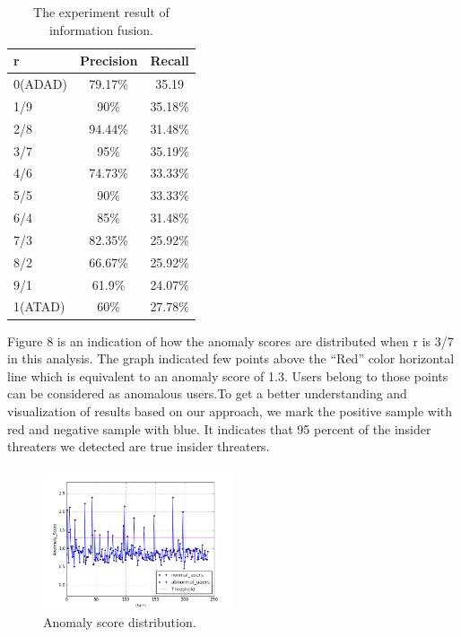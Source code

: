\documentclass[conference]{IEEEtran}
\begin{document}
\begin{table}[tbp]
\caption{The experiment result of information fusion.}
\centering  %
\begin{tabular}{lcc}  %
\hline
r  &Precision &Recall\\ \hline
0(ADAD) &79.17\% &35.19 \\\hline
1/9 &90\% &35.18\%\\\hline
2/8 &94.44\% &31.48\%\\\hline
3/7 &95\% &35.19\%\\\hline
4/6 &74.73\% &33.33\% \\\hline
5/5 &90\% &33.33\% \\\hline
6/4 &85\% &31.48\%\\\hline
7/3 &82.35\% &25.92\%\\\hline
8/2 &66.67\% &25.92\%\\\hline
9/1 &61.9\% &24.07\%\\\hline
1(ATAD) &60\% &27.78\%\\\hline
\end{tabular}

\end{table}

Figure 8 is an indication of how the anomaly scores are distributed when r is 3/7 in this analysis. The graph indicated few points above the “Red” color horizontal line which is equivalent to an anomaly score of 1.3. Users belong to those points can be considered as anomalous users.To get a better understanding and visualization of results based on our approach, we mark the positive sample with red and negative sample with blue. It indicates that 95 percent of the insider threaters we detected are true insider threaters.  

\begin{figure}[htb]
\centerline{\includegraphics[width = 0.5\textwidth]{figure/figure8.png}}
\caption{Anomaly score distribution.}
\label{fig}
\end{figure}
\end{document}
